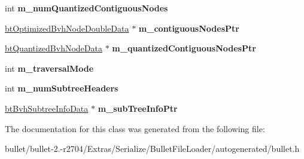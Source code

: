 \begin{DoxyCompactItemize}
\item 
\hypertarget{class_bullet_1_1bt_quantized_bvh_double_data_a1f55f91078fff848e24042e9b214ae9d}{int {\bfseries m\+\_\+num\+Quantized\+Contiguous\+Nodes}}\label{class_bullet_1_1bt_quantized_bvh_double_data_a1f55f91078fff848e24042e9b214ae9d}

\item 
\hypertarget{class_bullet_1_1bt_quantized_bvh_double_data_ae4f017ad51c372749c6fc2f584b2c081}{\hyperlink{class_bullet_1_1bt_optimized_bvh_node_double_data}{bt\+Optimized\+Bvh\+Node\+Double\+Data} $\ast$ {\bfseries m\+\_\+contiguous\+Nodes\+Ptr}}\label{class_bullet_1_1bt_quantized_bvh_double_data_ae4f017ad51c372749c6fc2f584b2c081}

\item 
\hypertarget{class_bullet_1_1bt_quantized_bvh_double_data_a8b696712880bcc9e03f412399b30cd0c}{\hyperlink{class_bullet_1_1bt_quantized_bvh_node_data}{bt\+Quantized\+Bvh\+Node\+Data} $\ast$ {\bfseries m\+\_\+quantized\+Contiguous\+Nodes\+Ptr}}\label{class_bullet_1_1bt_quantized_bvh_double_data_a8b696712880bcc9e03f412399b30cd0c}

\item 
\hypertarget{class_bullet_1_1bt_quantized_bvh_double_data_a58abd6f5e4ce1dd81715110d54d91928}{int {\bfseries m\+\_\+traversal\+Mode}}\label{class_bullet_1_1bt_quantized_bvh_double_data_a58abd6f5e4ce1dd81715110d54d91928}

\item 
\hypertarget{class_bullet_1_1bt_quantized_bvh_double_data_aaf92743f806abb9d22886bdefd8c4914}{int {\bfseries m\+\_\+num\+Subtree\+Headers}}\label{class_bullet_1_1bt_quantized_bvh_double_data_aaf92743f806abb9d22886bdefd8c4914}

\item 
\hypertarget{class_bullet_1_1bt_quantized_bvh_double_data_a26befd7a16021cc1f48d75ae056718a1}{\hyperlink{class_bullet_1_1bt_bvh_subtree_info_data}{bt\+Bvh\+Subtree\+Info\+Data} $\ast$ {\bfseries m\+\_\+sub\+Tree\+Info\+Ptr}}\label{class_bullet_1_1bt_quantized_bvh_double_data_a26befd7a16021cc1f48d75ae056718a1}

\end{DoxyCompactItemize}


The documentation for this class was generated from the following file\+:\begin{DoxyCompactItemize}
\item 
bullet/bullet-\/2.-\/r2704/\+Extras/\+Serialize/\+Bullet\+File\+Loader/autogenerated/bullet.\+h\end{DoxyCompactItemize}
